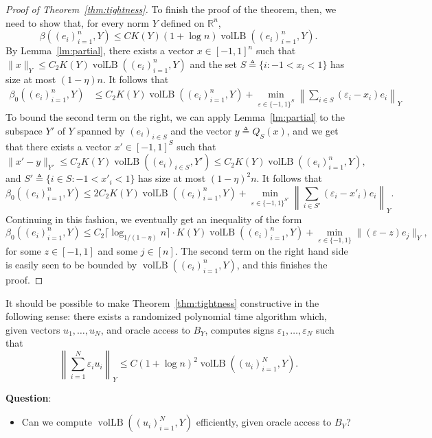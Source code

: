 \documentclass{article}
\newcommand{\R}{{\mathbb{R}}}
\newcommand\eps{\varepsilon}
\newcommand{\eqdef}{\triangleq}
\DeclareMathOperator{\vollb}{volLB}
\begin{document}
\begin{proof}[Proof of Theorem~\ref{thm:tightness}]
  To finish the proof of the theorem, then, we need to show that, for every norm $Y$
  defined on $\R^n$, 
  \[
  \beta((e_i)_{i = 1}^n, Y) \le CK(Y)(1+\log n) \vollb((e_i)_{i = 1}^n, Y).
  \]
  By Lemma~\ref{lm:partial}, there exists a vector $x \in [-1,1]^n$
  such that $\|x\|_Y \le C_2K(Y)\vollb((e_i)_{i=1}^n, Y)$ and
  the set $S \eqdef \{i: -1 < x_i < 1\}$ has size at most
  $(1-\eta)n$.
  It follows that 
  \begin{align*}
    \beta_0((e_i)_{i = 1}^n, Y) &\le C_2K(Y)\vollb((e_i)_{i=1}^n, Y)
    + 
    \min_{\eps \in \{-1, 1\}^S}\left\|\sum_{i \in S}{(\eps_i -  x_i)e_i}\right\|_Y
  \end{align*}
  To bound the second term on the right, we can apply Lemma~\ref{lm:partial} to the
  subspace $Y'$ of $Y$ spanned by $(e_i)_{i \in S}$ and the vector $y
  \eqdef Q_S(x)$, and we get that there exists a vector $x' \in
  [-1,1]^S$ such that 
  \[
  \|x' - y\|_{Y'} \le C_2K(Y)\vollb((e_i)_{i\in S}, Y')
  \le C_2K(Y)\vollb((e_i)_{i=1}^n, Y),  
  \]
  and $S' \eqdef \{i \in S: -1 < x'_i < 1\}$ has size at most
  $(1-\eta)^2n$. It follows that 
  \[
  \beta_0((e_i)_{i = 1}^n, Y) \le 2C_2K(Y)\vollb((e_i)_{i=1}^n, Y)
  + 
  \min_{\eps \in \{-1, 1\}^{S'}}\left\|\sum_{i \in S'}{(\eps_i -  x'_i)e_i}\right\|_Y.
  \]
  Continuing in this fashion, we eventually get an inequality of the
  form
  \[
  \beta_0((e_i)_{i = 1}^n, Y) \le C_2\lceil \log_{1/(1-\eta)}n\rceil\cdot
  K(Y)\vollb((e_i)_{i=1}^n, Y)
  + \min_{\eps \in \{-1, 1\}}\|(\eps - z)e_j\|_Y,
  \]
  for some $z \in [-1, 1]$ and some $j \in [n]$. The second term on
  the right hand side is easily seen to be bounded by
  $\vollb((e_i)_{i=1}^n, Y)$, and this finishes the proof.
\end{proof}

It should be possible to make Theorem~\ref{thm:tightness} constructive in the
following sense: there exists a randomized polynomial time algorithm
which, given vectors $u_1, \ldots, u_N$, and oracle access to $B_Y$,
computes signs $\eps_1, \ldots, \eps_N$ such that 
\[
\left\|\sum_{i = 1}^N{\eps_i u_i}\right\|_Y \le  
C(1+\log n)^2\vollb((u_i)_{i = 1}^N, Y). 
\]

\medskip\noindent
\textbf{Question}:
\begin{itemize}
\item Can we compute $\vollb((u_i)_{i = 1}^N, Y)$ efficiently, given
  oracle access to $B_Y$?
\end{itemize}
\end{document}
